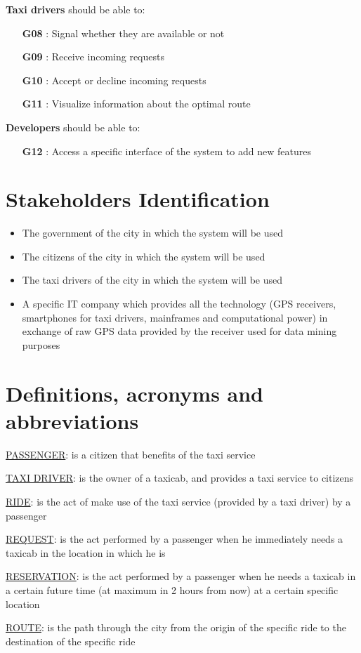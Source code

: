 \noindent \textbf{Taxi drivers} should be able to:
\begin{itemize}
	\item [\textbf{G08}] : Signal whether they are available or not
	\item [\textbf{G09}] : Receive incoming requests
	\item [\textbf{G10}] : Accept or decline incoming requests
	\item [\textbf{G11}] : Visualize information about the optimal route
\end{itemize}

\noindent \textbf{Developers} should be able to:
\begin{itemize}
	\item [\textbf{G12}] : Access a specific interface of the system to add new features
\end{itemize}

\section{Stakeholders Identification}
\begin{itemize}
	\item The government of the city in which the system will be used
	\item The citizens of the city in which the system will be used
	\item The taxi drivers of the city in which the system will be used
	\item A specific IT company which provides all the technology (GPS receivers, smartphones for taxi drivers, mainframes and computational power) in exchange of raw GPS data provided by the receiver used for data mining purposes
\end{itemize}

\section{Definitions, acronyms and abbreviations}
\begin{description}
	\item \underline{PASSENGER}: is a citizen that benefits of the taxi service
	\item \underline{TAXI DRIVER}: is the owner of a taxicab, and provides a taxi service to citizens
	\item \underline{RIDE}: is the act of make use of the taxi service (provided by a taxi driver) by a passenger
	\item \underline{REQUEST}: is the act performed by a passenger when he immediately needs a taxicab in the location in which he is 
	\item \underline{RESERVATION}: is the act performed by a passenger when he needs a taxicab in a certain future time (at maximum in 2 hours from now) at a certain specific location
	\item \underline{ROUTE}: is the path through the city from the origin of the specific ride to the destination of the specific ride
\end{description}

